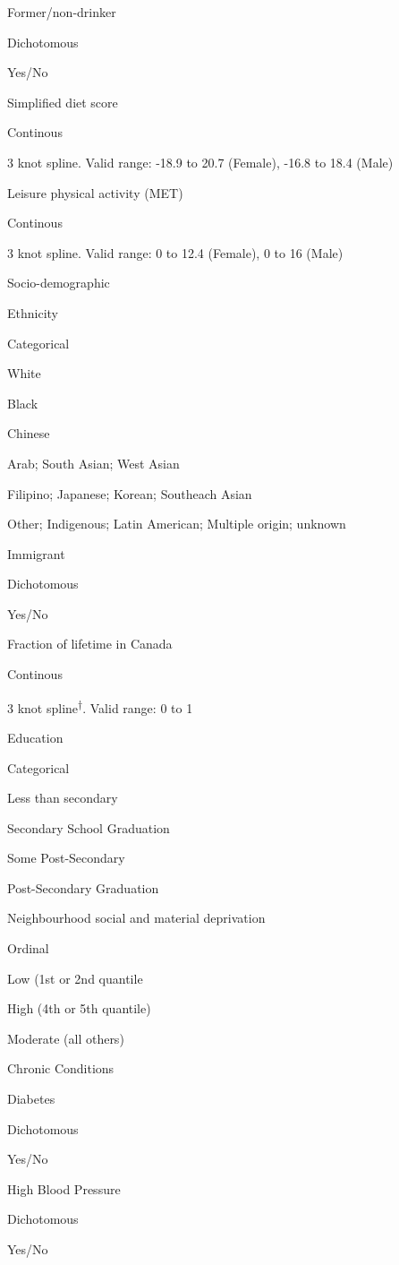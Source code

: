 \documentclass[]{book}
\begin{document}
Former/non-drinker

Dichotomous

Yes/No

Simplified diet score

Continous

3 knot spline. Valid range: -18.9 to 20.7 (Female), -16.8 to 18.4 (Male)

Leisure physical activity (MET)

Continous

3 knot spline. Valid range: 0 to 12.4 (Female), 0 to 16 (Male)

Socio-demographic

Ethnicity

Categorical

White

Black

Chinese

Arab; South Asian; West Asian

Filipino; Japanese; Korean; Southeach Asian

Other; Indigenous; Latin American; Multiple origin; unknown

Immigrant

Dichotomous

Yes/No

Fraction of lifetime in Canada

Continous

3 knot spline\textsuperscript{†}. Valid range: 0 to 1

Education

Categorical

Less than secondary

Secondary School Graduation

Some Post-Secondary

Post-Secondary Graduation

Neighbourhood social and material
deprivation

Ordinal

Low (1st or 2nd quantile

High (4th or 5th quantile)

Moderate (all others)

Chronic Conditions

Diabetes

Dichotomous

Yes/No

High Blood Pressure

Dichotomous

Yes/No
\end{document}
